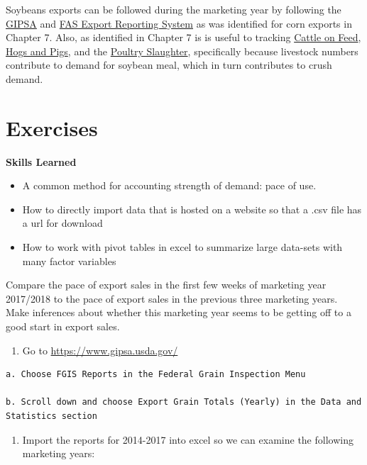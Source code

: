 \documentclass[
  letterpaper,
  DIV=11,
  numbers=noendperiod]{scrreprt}
\providecommand{\tightlist}{%
  \setlength{\itemsep}{0pt}\setlength{\parskip}{0pt}}\usepackage{longtable,booktabs,array}
\begin{document}
Soybeans exports can be followed during the marketing year by following
the \href{}{GIPSA} and \href{}{FAS Export Reporting System} as was
identified for corn exports in Chapter 7. Also, as identified in Chapter
7 is is useful to tracking
\href{http://usda.mannlib.cornell.edu/MannUsda/viewDocumentInfo.do?documentID=1020}{Cattle
on Feed},
\href{http://usda.mannlib.cornell.edu/MannUsda/viewDocumentInfo.do?documentID=1086}{Hogs
and Pigs}, and the
\href{https://usda.mannlib.cornell.edu/MannUsda/viewDocumentInfo.do?documentID=1131}{Poultry
Slaughter}, specifically because livestock numbers contribute to demand
for soybean meal, which in turn contributes to crush demand.

\hypertarget{exercises-3}{%
\section{Exercises}\label{exercises-3}}

\textbf{Skills Learned}

\begin{itemize}
\item
  A common method for accounting strength of demand: pace of use.
\item
  How to directly import data that is hosted on a website so that a .csv
  file has a url for download
\item
  How to work with pivot tables in excel to summarize large data-sets
  with many factor variables
\end{itemize}

Compare the pace of export sales in the first few weeks of marketing
year 2017/2018 to the pace of export sales in the previous three
marketing years. Make inferences about whether this marketing year seems
to be getting off to a good start in export sales.

\begin{enumerate}
\def\labelenumi{\arabic{enumi}.}
\tightlist
\item
  Go to \url{https://www.gipsa.usda.gov/}
\end{enumerate}

\begin{verbatim}
a. Choose FGIS Reports in the Federal Grain Inspection Menu  

b. Scroll down and choose Export Grain Totals (Yearly) in the Data and Statistics section  
\end{verbatim}

\begin{enumerate}
\def\labelenumi{\arabic{enumi}.}
\setcounter{enumi}{1}
\tightlist
\item
  Import the reports for 2014-2017 into excel so we can examine the
  following marketing years:
\end{enumerate}
\end{document}
